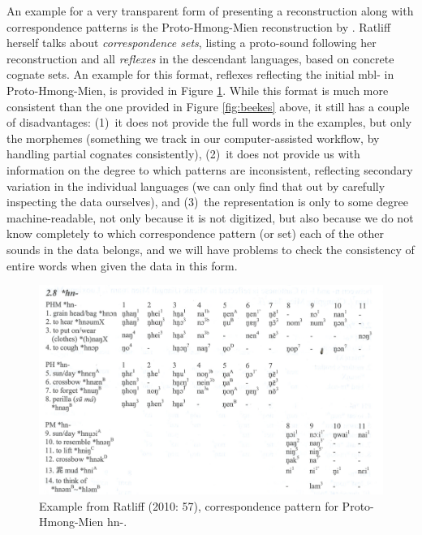 \documentclass[xetex,svgnames]{scrartcl}
\begin{document}
An example for a very transparent form of presenting a reconstruction along with correspondence
patterns is the Proto-Hmong-Mien reconstruction by \citet{Ratliff2010}. Ratliff herself talks about
\emph{correspondence sets}, listing a proto-sound following her reconstruction and all
\emph{reflexes} in the descendant languages, based on concrete cognate sets. An example for this
format, reflexes reflecting the initial {\sil *mbl-} in Proto-Hmong-Mien, is provided in Figure
\ref{fig:ratliff}. While this format is much more consistent than the one provided in Figure
\ref{fig:beekes} above, it still has a couple of disadvantages: (1)~it does not provide the full
words in the examples, but only the morphemes (something we track in our computer-assisted workflow,
by handling partial cognates consistently), (2)~it does not provide us with information on the
degree to which patterns are inconsistent, reflecting secondary variation in the individual
languages (we can only find that out by carefully inspecting the data ourselves), and (3)~the
representation is only to some degree machine-readable, not only because it is not digitized, but
also because we do not know completely to which correspondence pattern (or set) each of the other
sounds in the data belongs, and we will have problems to check the consistency of entire words when
given the data in this form.


\begin{figure}[htb]
  \centering
  \includegraphics[width=\textwidth]{ratliff2010.png}
  \caption{Example from Ratliff (2010: 57), correspondence pattern for Proto-Hmong-Mien {\sil *hn-}.}
  \label{fig:ratliff}
\end{figure}
\end{document}
